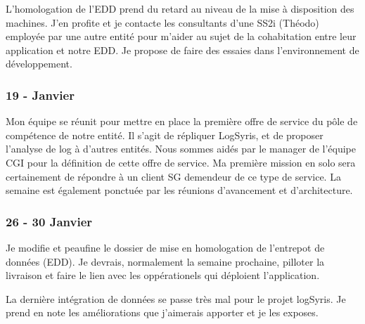 L'homologation de l'EDD prend du retard au niveau de la mise à disposition des machines. J'en profite et je contacte les consultants d’une SS2i (Théodo) employée par une autre entité pour m’aider au sujet de la cohabitation entre leur application et notre EDD. Je propose de faire des essaies dans l’environnement de développement.
\subsubsection*{19 - Janvier}
Mon équipe se réunit pour mettre en place la première offre de service du pôle de compétence de notre entité. Il s’agit de répliquer LogSyris, et de proposer l’analyse de log à d’autres entités. Nous sommes aidés par le manager de l’équipe CGI pour la définition de cette offre de service. Ma première mission en solo sera certainement de répondre à un client SG demendeur de ce type de service. La semaine est également ponctuée par les réunions d’avancement et d’architecture.
\subsubsection*{26 - 30 Janvier}
Je modifie et peaufine le dossier de mise en homologation de l'entrepot de données (EDD). Je devrais, normalement la semaine prochaine, pilloter la livraison et faire le lien avec les oppérationels qui déploient l'application.

La dernière intégration de données se passe très mal pour le projet logSyris. Je prend en note les améliorations que j'aimerais apporter et je les exposes.  
